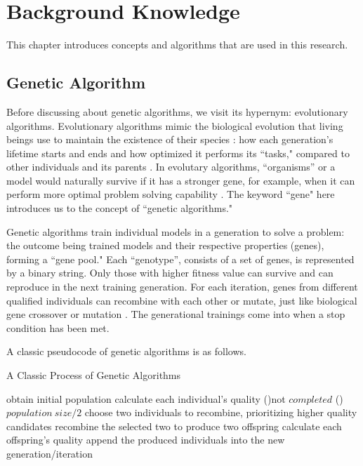 \chapter{Background Knowledge}
\label{Background Knowledge}
\indent \indent This chapter introduces concepts and algorithms that are used in this research.

\section{Genetic Algorithm}
\indent \indent Before discussing about genetic algorithms, we visit its hypernym: evolutionary algorithms. Evolutionary algorithms mimic the biological evolution that living beings use to maintain the existence of their species \cite{GA02}: how each generation's lifetime starts and ends and how optimized it performs its ``tasks," compared to other individuals and its parents \cite{GA03}. In evolutary algorithms, ``organisms'' or a model would naturally survive if it has a stronger gene, for example, when it can perform more optimal problem solving capability \cite{GA01}. The keyword ``gene" here introduces us to the concept of ``genetic algorithms."

Genetic algorithms train individual models in a generation to solve a problem: the outcome being trained models and their respective properties (genes), forming a ``gene pool." Each ``genotype'', consists of a set of genes, is represented by a binary string. Only those with higher fitness value can survive and can reproduce in the next training generation. For each iteration, genes from different qualified individuals can recombine with each other or mutate, just like biological gene crossover or mutation \cite{GA01, GA04}. The generational trainings come into when a stop condition has been met.

A classic pseudocode of genetic algorithms is as follows.

\begin{algorithm}
\caption{A Classic Process of Genetic Algorithms \cite{GA05}}
\label{alg-GA}
	obtain initial population\;
	calculate each individual's quality\;
	\While(){not $completed$}{
		\For(){$population\:size / 2$}{
			choose two individuals to recombine, prioritizing higher quality candidates\;
			recombine the selected two to produce two offspring\;
			calculate each offspring's quality\;
			append the produced individuals into the new generation/iteration\;
		}
	}
\end{algorithm}

